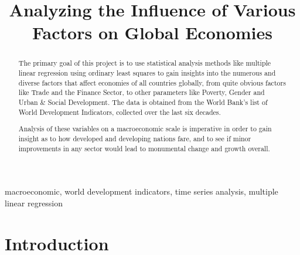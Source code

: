 \documentclass[conference]{IEEEtran}
\begin{document}
\title{Analyzing the Influence of Various Factors on Global Economies}

\author{
\and
{}
\and
{}
}

\maketitle

\begin{abstract}
The primary goal of this project is to use statistical analysis methods 
like multiple linear regression using ordinary least squares to gain insights 
into the numerous and diverse factors that affect economies 
of all countries globally, from quite obvious factors like 
Trade and the Finance Sector, to other parameters like Poverty, 
Gender and Urban \& Social Development. The data is obtained from the 
World Bank's list of World Development Indicators, collected over the 
last six decades. 

Analysis of these variables on a macroeconomic scale is imperative in 
order to gain insight as to how developed and developing nations fare, 
and to see if minor improvements in any sector would lead to 
monumental change and growth overall. \\
\end{abstract}

\begin{IEEEkeywords}
macroeconomic, world development indicators, time series analysis, multiple linear regression
\end{IEEEkeywords}

\section{Introduction}
\end{document}
